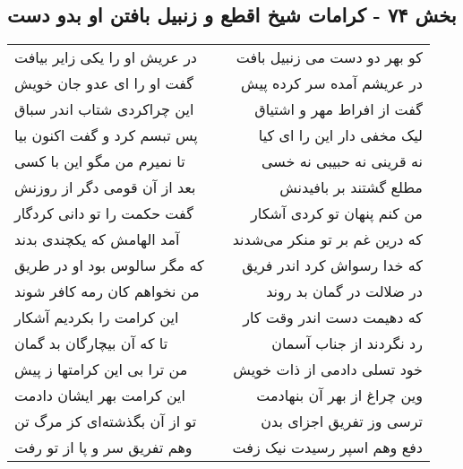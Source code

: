 \begin{center}
\section*{بخش ۷۴ - کرامات شیخ اقطع و زنبیل بافتن او بدو دست}
\label{sec:sh074}
\begin{longtable}{l p{0.5cm} r}
در عریش او را یکی زایر بیافت
&&
کو بهر دو دست می زنبیل بافت
\\
گفت او را ای عدو جان خویش
&&
در عریشم آمده سر کرده پیش
\\
این چراکردی شتاب اندر سباق
&&
گفت از افراط مهر و اشتیاق
\\
پس تبسم کرد و گفت اکنون بیا
&&
لیک مخفی دار این را ای کیا
\\
تا نمیرم من مگو این با کسی
&&
نه قرینی نه حبیبی نه خسی
\\
بعد از آن قومی دگر از روزنش
&&
مطلع گشتند بر بافیدنش
\\
گفت حکمت را تو دانی کردگار
&&
من کنم پنهان تو کردی آشکار
\\
آمد الهامش که یکچندی بدند
&&
که درین غم بر تو منکر می‌شدند
\\
که مگر سالوس بود او در طریق
&&
که خدا رسواش کرد اندر فریق
\\
من نخواهم کان رمه کافر شوند
&&
در ضلالت در گمان بد روند
\\
این کرامت را بکردیم آشکار
&&
که دهیمت دست اندر وقت کار
\\
تا که آن بیچارگان بد گمان
&&
رد نگردند از جناب آسمان
\\
من ترا بی این کرامتها ز پیش
&&
خود تسلی دادمی از ذات خویش
\\
این کرامت بهر ایشان دادمت
&&
وین چراغ از بهر آن بنهادمت
\\
تو از آن بگذشته‌ای کز مرگ تن
&&
ترسی وز تفریق اجزای بدن
\\
وهم تفریق سر و پا از تو رفت
&&
دفع وهم اسپر رسیدت نیک زفت
\\
\end{longtable}
\end{center}
